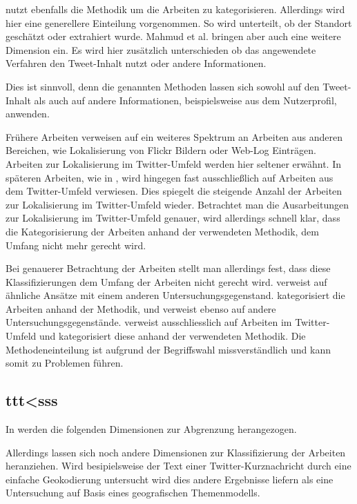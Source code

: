 		\cite{Mahmud2012} nutzt ebenfalls die Methodik um die Arbeiten zu kategorisieren. 
		Allerdings wird hier eine generellere Einteilung vorgenommen. 
		So wird unterteilt, ob der Standort geschätzt oder extrahiert wurde.  
		Mahmud et al. bringen aber auch eine weitere Dimension ein. 
		Es wird hier zusätzlich unterschieden ob das angewendete Verfahren den Tweet-Inhalt nutzt oder andere Informationen. 

		Dies ist sinnvoll, denn die genannten Methoden lassen sich sowohl auf den Tweet-Inhalt als auch auf andere Informationen, beispielsweise aus dem Nutzerprofil, anwenden. 
		
		Frühere Arbeiten verweisen auf ein weiteres Spektrum an Arbeiten aus anderen Bereichen, wie Lokalisierung von Flickr Bildern oder Web-Log Einträgen.
		Arbeiten zur Lokalisierung im Twitter-Umfeld werden hier seltener erwähnt. 
		In späteren Arbeiten, wie in \cite{Priedhorsky2013}, wird hingegen fast ausschließlich auf Arbeiten aus dem Twitter-Umfeld verwiesen. 
		Dies spiegelt die steigende Anzahl der Arbeiten zur Lokalisierung im Twitter-Umfeld wieder.
		Betrachtet man die Ausarbeitungen zur Lokalisierung im Twitter-Umfeld genauer, wird allerdings schnell klar, dass die Kategorisierung der Arbeiten anhand der verwendeten Methodik, dem Umfang nicht mehr gerecht wird. 
		
		Bei genauerer Betrachtung der Arbeiten stellt man allerdings fest, dass diese Klassifizierungen dem Umfang der Arbeiten nicht gerecht wird. 
		\cite{Hecht2011} verweist auf ähnliche Ansätze mit einem anderen Untersuchungsgegenstand.
		\cite{Cheng2010} kategorisiert die Arbeiten anhand der Methodik, und verweist ebenso auf andere Untersuchungsgegenstände. 
		\cite{Priedhorsky2013} verweist ausschliesslich auf Arbeiten im Twitter-Umfeld und kategorisiert diese anhand der verwendeten Methodik. 
		Die Methodeneinteilung ist aufgrund der Begriffswahl missverständlich und kann somit zu Problemen führen. 

		\subsection{ttt<sss}
		In \cite{Schulz2013} werden die folgenden Dimensionen zur Abgrenzung herangezogen.


		Allerdings lassen sich noch andere Dimensionen zur Klassifizierung der Arbeiten heranziehen. 
		Wird besipielsweise der Text einer Twitter-Kurznachricht durch eine einfache Geokodierung untersucht wird dies andere Ergebnisse liefern als eine Untersuchung auf Basis eines geografischen Themenmodells.  
		

